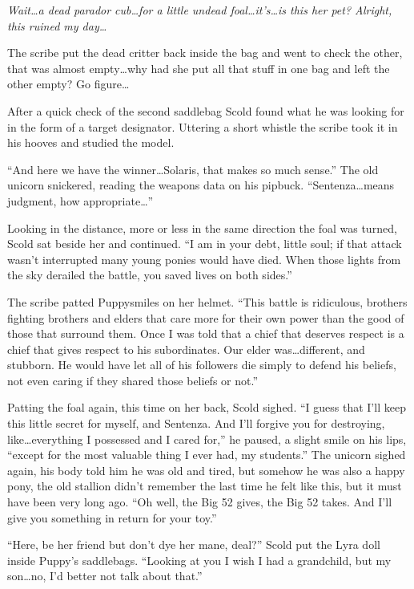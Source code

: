 \emph{Wait\dots a dead parador cub\dots for a little undead foal\dots it's\dots is this her pet? Alright, this ruined my day\dots}

The scribe put the dead critter back inside the bag and went to check the other, that was almost empty\dots why had she put all that stuff in one bag and left the other empty? Go figure\dots

After a quick check of the second saddlebag Scold found what he was looking for in the form of a target designator. Uttering a short whistle the scribe took it in his hooves and studied the model.

``And here we have the winner\dots Solaris, that makes so much sense.'' The old unicorn snickered, reading the weapons data on his pipbuck. ``Sentenza\dots means judgment, how appropriate\dots''

Looking in the distance, more or less in the same direction the foal was turned, Scold sat beside her and continued. ``I am in your debt, little soul; if that attack wasn't interrupted many young ponies would have died. When those lights from the sky derailed the battle, you saved lives on both sides.''

The scribe patted Puppysmiles on her helmet. ``This battle is ridiculous, brothers fighting brothers and elders that care more for their own power than the good of those that surround them. Once I was told that a chief that deserves respect is a chief that gives respect to his subordinates. Our elder was\dots different, and stubborn. He would have let all of his followers die simply to defend his beliefs, not even caring if they shared those beliefs or not.''

Patting the foal again, this time on her back, Scold sighed. ``I guess that I'll keep this little secret for myself, and Sentenza. And I'll forgive you for destroying, like\dots everything I possessed and I cared for,'' he paused, a slight smile on his lips, ``except for the most valuable thing I ever had, my students.'' The unicorn sighed again, his body told him he was old and tired, but somehow he was also a happy pony, the old stallion didn't remember the last time he felt like this, but it must have been very long ago. ``Oh well, the Big 52 gives, the Big 52 takes. And I'll give you something in return for your toy.''

``Here, be her friend but don't dye her mane, deal?'' Scold put the Lyra doll inside Puppy's saddlebags. ``Looking at you I wish I had a grandchild, but my son\dots no, I'd better not talk about that.''


